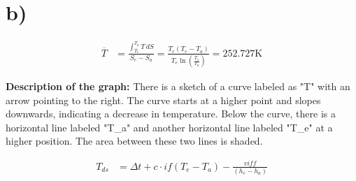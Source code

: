 

\section*{b)}
\begin{align*}
\overline{T} &= \frac{\int_{T_e}^{T_a} T \, dS}{S_e - S_a} = \frac{T_e (T_e - T_a)}{T_e \ln \left( \frac{T_e}{T_a} \right)} = 252.727 \text{K}
\end{align*}

\textbf{Description of the graph:} There is a sketch of a curve labeled as "T" with an arrow pointing to the right. The curve starts at a higher point and slopes downwards, indicating a decrease in temperature. Below the curve, there is a horizontal line labeled "T_a" and another horizontal line labeled "T_e" at a higher position. The area between these two lines is shaded.

\begin{align*}
T_{ds} &= \Delta t + c \cdot if(T_e - T_a) - \frac{viff}{(h_e - h_a)}
\end{align*}
